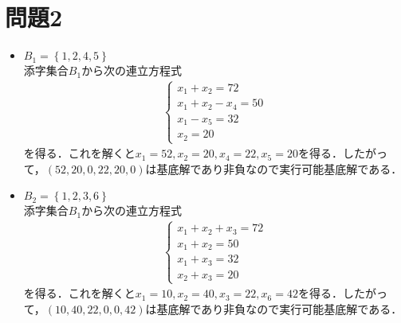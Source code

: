 \documentclass[a4j,uplatex]{jsarticle}
\theoremstyle{definition}
\begin{document}
\section{問題2}
\begin{itemize}
    \item{$B_1=\left\{1,2,4,5\right\}$} \\添字集合$B_1$から次の連立方程式
    \begin{align*}
        \begin{cases}
            x_1+x_2=72     \\
            x_1+x_2-x_4=50 \\
            x_1-x_5=32     \\
            x_2=20
        \end{cases}
    \end{align*}
    を得る．これを解くと$x_1=52,x_2=20,x_4=22,x_5=20$を得る．したがって，$(52,20,0,22,20,0)$は基底解であり非負なので実行可能基底解である．
    \item{$B_2=\left\{1,2,3,6\right\}$} \\添字集合$B_1$から次の連立方程式
    \begin{align*}
        \begin{cases}
            x_1+x_2+x_3=72 \\
            x_1+x_2=50     \\
            x_1+x_3=32     \\
            x_2+x_3=20
        \end{cases}
    \end{align*}
    を得る．これを解くと$x_1=10,x_2=40,x_3=22,x_6=42$を得る．したがって，$(10,40,22,0,0,42)$は基底解であり非負なので実行可能基底解である．
\end{itemize}
\end{document}
